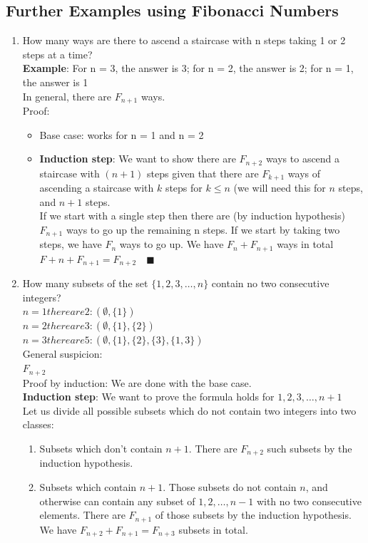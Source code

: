 \documentclass[9pt, letterpaper, oneside]{article}
\begin{document}
\subsection{Further Examples using Fibonacci Numbers}
\begin{enumerate}
\item How many ways are there to ascend a staircase with n steps taking 1 or 2 steps at a time?\\
\textbf{Example}: For n = 3, the answer is 3; for n = 2, the answer is 2; for n = 1, the answer is 1\\
In general, there are $F_{n+1}$ ways.\\
Proof: 
\begin{itemize}
\item Base case: works for n = 1 and n = 2
\item \textbf{Induction step}: We want to show there are $F_{n+2}$ ways to ascend a staircase with $(n+1)$ steps given that there are  $F_{k+1}$ ways of ascending a staircase with $k$ steps for $k \leq n$ (we will need this for $n$ steps, and $n+ 1$ steps.\\
If we start with a single step then there are (by induction hypothesis) $F_{n+1}$ ways to go up the remaining n steps. If we start by taking two steps, we have $F_n$ ways to go up. We have $F_n +F_{n+1}$ ways in total $F+n + F_{n+1} = F_{n+2} \quad \blacksquare$
\end{itemize}
\item How many subsets of the set $\{1,2,3,\ldots ,n\}$ contain no two consecutive integers?\\
$n = 1 there are 2: (\emptyset, \{1\})$\\
$n = 2 there are 3: (\emptyset, \{1\}, \{2\})$\\
$n = 3 there are 5: (\emptyset, \{1\}, \{2\}, \{3\}, \{1,3\})$\\
General suspicion:\\
$F_{n+2}$\\
Proof by induction: We are done with the base case.\\

\textbf{Induction step}: We want to prove the formula holds for ${1, 2, 3, \ldots, n + 1}$\\
Let us divide all possible subsets which do not contain two integers into two classes:\\
\begin{enumerate}
\item Subsets which don't contain $n + 1$. There are $F_{n+2}$ such subsets by the induction hypothesis. 
\item Subsets which contain $n + 1$. Those subsets do not contain $n$, and otherwise can contain any subset of ${1, 2, \ldots, n - 1}$ with no two consecutive elements. There are $F_{n+1}$ of those subsets by the induction hypothesis. We have $F_{n+2} + F_{n+1} = F_{n+3}$ subsets in total.
\end{enumerate}
\end{enumerate}
\end{document}

